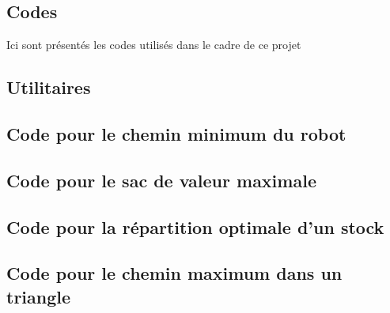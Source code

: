\documentclass[a4paper,english,french]{article}
\begin{document}
\newpage
\begin{appendix}

\section{Codes}

Ici sont présentés les codes utilisés dans le cadre de ce projet

\subsection{Utilitaires}

\subsection{Code pour le chemin minimum du robot}

\subsection{Code pour le sac de valeur maximale}

\subsection{Code pour la répartition optimale d'un stock}

\subsection{Code pour le chemin maximum dans un triangle}

\end{appendix}
\end{document}
